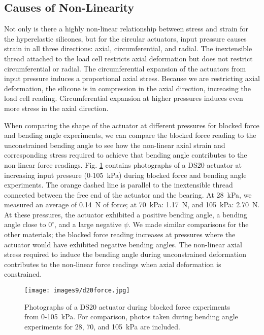 \clearpage
\subsection{Causes of Non-Linearity}

Not only is there a highly non-linear relationship between stress and strain for the hyperelastic silicones, but for the circular actuators, input pressure causes strain in all three directions: axial, circumferential, and radial. The inextensible thread attached to the load cell restricts axial deformation but does not restrict circumferential or radial. The circumferential expansion of the actuators from input pressure induces a proportional axial stress. Because we are restricting axial deformation, the silicone is in compression in the axial direction, increasing the load cell reading. Circumferential expansion at higher pressures induces even more stress in the axial direction. 

When comparing the shape of the actuator at different pressures for blocked force and bending angle experiments, we can compare the blocked force reading to the unconstrained bending angle to see how the non-linear axial strain and corresponding stress required to achieve that bending angle contributes to the non-linear force readings. Fig. \ref{fig:d20force} contains photographs of a DS20 actuator at increasing input pressure (0-105~kPa) during blocked force and bending angle experiments. The orange dashed line is parallel to the inextensible thread connected between the free end of the actuator and the bearing. At 28~kPa, we measured an average of 0.14~N of force; at 70~kPa: 1.17~N, and 105~kPa: 2.70~N. At these pressures, the actuator exhibited a positive bending angle, a bending angle close to $0^\circ$, and a large negative $\psi$. We made similar comparisons for the other materials; the blocked force reading increases at pressures where the actuator would have exhibited negative bending angles. The non-linear axial stress required to induce the bending angle during unconstrained deformation contributes to the non-linear force readings when axial deformation is constrained. 

\begin{figure}[ht]
    \centering
     \texttt{[image: images9/d20force.jpg]}
    \caption{Photographs of a DS20 actuator during blocked force experiments from 0-105~kPa. For comparison, photos taken during bending angle experiments for 28, 70, and 105~kPa are included.}
    \label{fig:d20force}
\end{figure}

